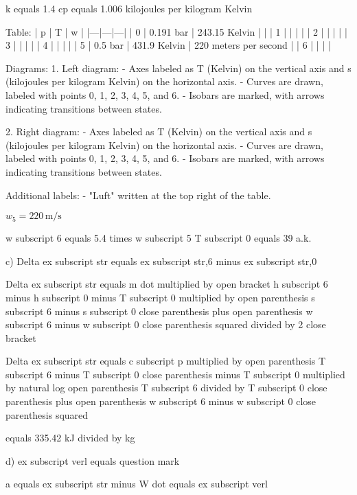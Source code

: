 k equals 1.4  
cp equals 1.006 kilojoules per kilogram Kelvin  

Table:  
| p | T | w |  
|---|---|---|  
| 0 | 0.191 bar | 243.15 Kelvin |   |  
| 1 |   |   |   |  
| 2 |   |   |   |  
| 3 |   |   |   |  
| 4 |   |   |   |  
| 5 | 0.5 bar | 431.9 Kelvin | 220 meters per second |  
| 6 |   |   |   |  

Diagrams:  
1. Left diagram:  
- Axes labeled as T (Kelvin) on the vertical axis and s (kilojoules per kilogram Kelvin) on the horizontal axis.  
- Curves are drawn, labeled with points 0, 1, 2, 3, 4, 5, and 6.  
- Isobars are marked, with arrows indicating transitions between states.  

2. Right diagram:  
- Axes labeled as T (Kelvin) on the vertical axis and s (kilojoules per kilogram Kelvin) on the horizontal axis.  
- Curves are drawn, labeled with points 0, 1, 2, 3, 4, 5, and 6.  
- Isobars are marked, with arrows indicating transitions between states.  

Additional labels:  
- "Luft" written at the top right of the table.

\( w_5 = 220 \, \text{m/s} \)

w subscript 6 equals 5.4 times w subscript 5  
T subscript 0 equals 39 a.k.  

c)  
Delta ex subscript str equals ex subscript str,6 minus ex subscript str,0  

Delta ex subscript str equals m dot multiplied by open bracket h subscript 6 minus h subscript 0 minus T subscript 0 multiplied by open parenthesis s subscript 6 minus s subscript 0 close parenthesis plus open parenthesis w subscript 6 minus w subscript 0 close parenthesis squared divided by 2 close bracket  

Delta ex subscript str equals c subscript p multiplied by open parenthesis T subscript 6 minus T subscript 0 close parenthesis minus T subscript 0 multiplied by natural log open parenthesis T subscript 6 divided by T subscript 0 close parenthesis plus open parenthesis w subscript 6 minus w subscript 0 close parenthesis squared  

equals 335.42 kJ divided by kg  

d)  
ex subscript verl equals question mark  

a equals ex subscript str minus W dot equals ex subscript verl